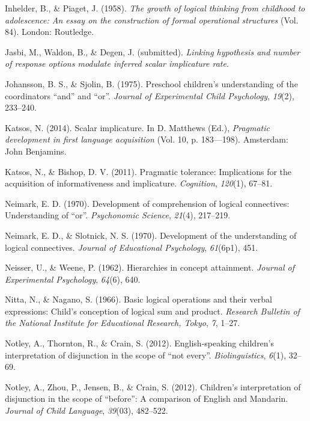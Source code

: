 \documentclass[floatsintext,man]{apa6}
\theoremstyle{definition}
\theoremstyle{definition}
\theoremstyle{definition}
\theoremstyle{remark}
\begin{document}
\hypertarget{ref-piaget1958growth}{}
Inhelder, B., \& Piaget, J. (1958). \emph{The growth of logical thinking
from childhood to adolescence: An essay on the construction of formal
operational structures} (Vol. 84). London: Routledge.

\hypertarget{ref-jasbiWaldonDegan2017}{}
Jasbi, M., Waldon, B., \& Degen, J. (submitted). \emph{Linking
hypothesis and number of response options modulate inferred scalar
implicature rate}.

\hypertarget{ref-johansson1975preschool}{}
Johansson, B. S., \& Sjolin, B. (1975). Preschool children's
understanding of the coordinators ``and'' and ``or''. \emph{Journal of
Experimental Child Psychology}, \emph{19}(2), 233--240.

\hypertarget{ref-katsos2014scalar}{}
Katsos, N. (2014). Scalar implicature. In D. Matthews (Ed.),
\emph{Pragmatic development in first language acquisition} (Vol. 10, p.
183---198). Amsterdam: John Benjamins.

\hypertarget{ref-katsos2011pragmatic}{}
Katsos, N., \& Bishop, D. V. (2011). Pragmatic tolerance: Implications
for the acquisition of informativeness and implicature.
\emph{Cognition}, \emph{120}(1), 67--81.

\hypertarget{ref-neimark1970}{}
Neimark, E. D. (1970). Development of comprehension of logical
connectives: Understanding of ``or''. \emph{Psychonomic Science},
\emph{21}(4), 217--219.

\hypertarget{ref-neimarkSlotnick1970}{}
Neimark, E. D., \& Slotnick, N. S. (1970). Development of the
understanding of logical connectives. \emph{Journal of Educational
Psychology}, \emph{61}(6p1), 451.

\hypertarget{ref-neisser1962hierarchies}{}
Neisser, U., \& Weene, P. (1962). Hierarchies in concept attainment.
\emph{Journal of Experimental Psychology}, \emph{64}(6), 640.

\hypertarget{ref-nitta1966basic}{}
Nitta, N., \& Nagano, S. (1966). Basic logical operations and their
verbal expressions: Child's conception of logical sum and product.
\emph{Research Bulletin of the National Institute for Educational
Research, Tokyo}, \emph{7}, 1--27.

\hypertarget{ref-notley2012notevery}{}
Notley, A., Thornton, R., \& Crain, S. (2012). English-speaking
children's interpretation of disjunction in the scope of ``not every''.
\emph{Biolinguistics}, \emph{6}(1), 32--69.

\hypertarget{ref-notley2012children}{}
Notley, A., Zhou, P., Jensen, B., \& Crain, S. (2012). Children's
interpretation of disjunction in the scope of ``before'': A comparison
of English and Mandarin. \emph{Journal of Child Language},
\emph{39}(03), 482--522.
\end{document}
